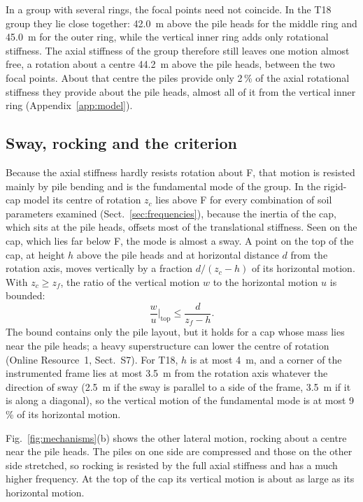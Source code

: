 \documentclass[11pt]{article}
\begin{document}
In a group with several rings, the focal points need not coincide. In the T18 group they lie close together: 42.0~m above the pile heads for the middle ring and 45.0~m for the outer ring, while the vertical inner ring adds only rotational stiffness. The axial stiffness of the group therefore still leaves one motion almost free, a rotation about a centre 44.2~m above the pile heads, between the two focal points. About that centre the piles provide only 2\,\% of the axial rotational stiffness they provide about the pile heads, almost all of it from the vertical inner ring (Appendix~\ref{app:model}).

\subsection{Sway, rocking and the criterion}
\label{sec:mechanisms}

Because the axial stiffness hardly resists rotation about F, that motion is resisted mainly by pile bending and is the fundamental mode of the group. In the rigid-cap model its centre of rotation $z_c$ lies above F for every combination of soil parameters examined (Sect.~\ref{sec:frequencies}), because the inertia of the cap, which sits at the pile heads, offsets most of the translational stiffness. Seen on the cap, which lies far below F, the mode is almost a sway. A point on the top of the cap, at height $h$ above the pile heads and at horizontal distance $d$ from the rotation axis, moves vertically by a fraction $d/(z_c-h)$ of its horizontal motion. With $z_c \geq z_f$, the ratio of the vertical motion $w$ to the horizontal motion $u$ is bounded:
%
\begin{equation}
\frac{w}{u}\bigg|_{\mathrm{top}} \leq \frac{d}{z_f - h} .
\label{eq:vh}
\end{equation}
%
The bound contains only the pile layout, but it holds for a cap whose mass lies near the pile heads; a heavy superstructure can lower the centre of rotation (Online Resource~1, Sect.~S7). For T18, $h$ is at most 4~m, and a corner of the instrumented frame lies at most 3.5~m from the rotation axis whatever the direction of sway (2.5~m if the sway is parallel to a side of the frame, 3.5~m if it is along a diagonal), so the vertical motion of the fundamental mode is at most 9\,\% of its horizontal motion.

Fig.~\ref{fig:mechanisms}(b) shows the other lateral motion, rocking about a centre near the pile heads. The piles on one side are compressed and those on the other side stretched, so rocking is resisted by the full axial stiffness and has a much higher frequency. At the top of the cap its vertical motion is about as large as its horizontal motion.
\end{document}
